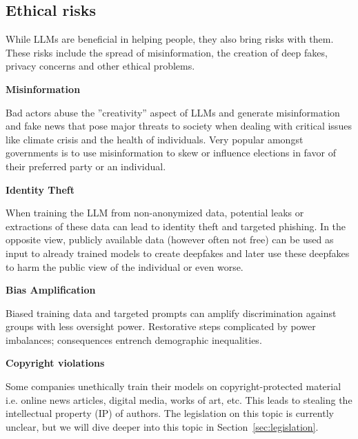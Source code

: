 \subsection{Ethical risks}
While LLMs are beneficial in helping people, they also bring risks with them. These risks include the spread of misinformation, the creation of deep fakes, privacy concerns and other ethical problems. 


\textbf{Misinformation}

Bad actors abuse the ''creativity'' aspect of LLMs and generate misinformation and fake news that pose major threats to society when dealing with critical issues like climate crisis and the health of individuals. Very popular amongst governments is to use misinformation to skew or influence elections in favor of their preferred party or an individual.

\textbf{Identity Theft}

When training the LLM from non-anonymized data, potential leaks or extractions of these data can lead to identity theft and targeted phishing. 
In the opposite view, publicly available data (however often not free) can be used as input to already trained models to create deepfakes and later use these deepfakes to harm the public view of the individual or even worse.

\textbf{Bias Amplification}

Biased training data and targeted prompts can amplify discrimination against groups with less oversight power. 
Restorative steps complicated by power imbalances; consequences entrench demographic inequalities\cite{kumar2024ethicsinteractionmitigatingsecurity}. 


\textbf{Copyright violations}

Some companies unethically train their models on copyright-protected material i.e. online news articles, digital media, works of art, etc. This leads to stealing the intellectual property (IP) of authors. The legislation on this topic is currently unclear, but we will dive deeper into this topic in Section~\ref{sec:legislation}.

